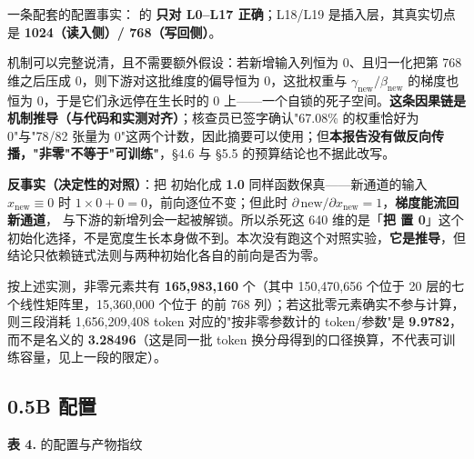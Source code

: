 \documentclass[11pt,openany]{ctexart}
\begin{document}
\begin{notebox}
一条配套的配置事实： 的  \textbf{只对 L0–L17 正确}；L18/L19 是插入层，其真实切点是 \textbf{1024（读入侧）/ 768（写回侧）}。
\end{notebox}

机制可以完整说清，且不需要额外假设：若新增输入列恒为 0、且归一化把第 768 维之后压成 0，则下游对这批维度的偏导恒为 0，这批权重与 $\gamma_{\text{new}}/\beta_{\text{new}}$ 的梯度也恒为 0，于是它们永远停在生长时的 0 上——一个自锁的死子空间。\textbf{这条因果链是机制推导（与代码和实测对齐）}；核查员已签字确认"67.08\allowbreak{}\% 的权重恰好为 0"与"78/82 张量为 0"这两个计数，因此摘要可以使用；但\textbf{本报告没有做反向传播，"非零"不等于"可训练"}，§4.6 与 §5.5 的预算结论也不据此改写。

\begin{notebox}
\textbf{反事实（决定性的对照）}：把  初始化成 \textbf{1.0} 同样函数保真——新通道的输入 $x_{\text{new}}\equiv0$ 时 $1\times0+0=0$，前向逐位不变；但此时 $\partial\,\text{new}/\partial x_{\text{new}}=1$，\textbf{梯度能流回新通道}， 与下游的新增列会一起被解锁。所以杀死这 640 维的是「\textbf{把  置 0}」这个初始化选择，不是宽度生长本身做不到。本次没有跑这个对照实验，\textbf{它是推导}，但结论只依赖链式法则与两种初始化各自的前向是否为零。
\end{notebox}

按上述实测，非零元素共有 \textbf{165,983,160} 个（其中 150,470,656 个位于 20 层的七个线性矩阵里，15,360,000 个位于  的前 768 列）；若这批零元素确实不参与计算，则三段消耗 1,656,209,408 token 对应的"按非零参数计的 token/参数"是 \textbf{9.9782}，而不是名义的 \textbf{3.28496}（这是同一批 token 换分母得到的口径换算，不代表可训练容量，见上一段的限定）。

\subsection{0.5B 配置}

\noindent\textbf{表 4.}  的配置与产物指纹
\end{document}
